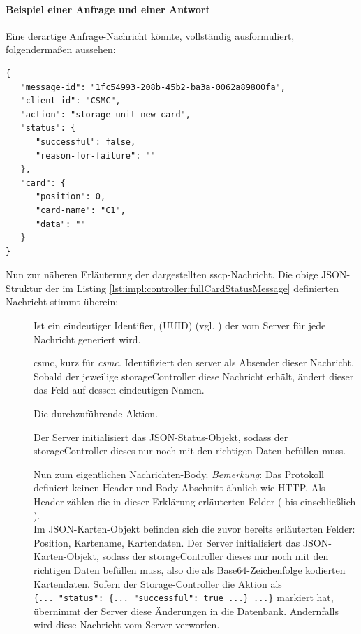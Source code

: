 \paragraph{Beispiel einer Anfrage und einer Antwort}
Eine derartige Anfrage-Nachricht könnte, vollständig ausformuliert, folgendermaßen aussehen:
\begin{lstlisting}[style=goMono,label={lst:impl:storagecontroller:jsonmessage},caption={\centering Anfrage: Ausformulierte JSON-Repräsentation eines Karten-Nachricht Objektes mit Header, Status und Card}]
{
   "message-id": "1fc54993-208b-45b2-ba3a-0062a89800fa",
   "client-id": "CSMC",   
   "action": "storage-unit-new-card",
   "status": {
      "successful": false,
      "reason-for-failure": ""
   },
   "card": {
      "position": 0,
      "card-name": "C1",
      "data": ""
   }
}
\end{lstlisting}
Nun zur näheren Erläuterung der dargestellten \acrshort{sscp}-Nachricht. Die obige JSON-Struktur der im Listing \ref{lst:impl:controller:fullCardStatusMessage} definierten Nachricht stimmt überein:
\begin{description}
\item[] Ist ein eindeutiger Identifier, (UUID) (vgl. \cite{wiki:uuid}) der vom Server für jede Nachricht generiert wird.
\item[] \acrshort{csmc}, kurz für \textit{\acrlong{csmc}}. Identifiziert den \gls{server} als Absender dieser Nachricht. Sobald der jeweilige \gls{storageController} diese Nachricht erhält, ändert dieser das Feld auf dessen eindeutigen Namen.
\item[] Die durchzuführende Aktion.
\item[] Der Server initialisiert das JSON-Status-Objekt, sodass der \gls{storageController} dieses nur noch mit den richtigen Daten befüllen muss.
\item[] Nun zum eigentlichen Nachrichten-Body. \textit{Bemerkung}: Das Protokoll definiert keinen Header und Body Abschnitt ähnlich wie HTTP. Als Header zählen die in dieser Erklärung erläuterten Felder ( bis einschließlich ).\\ Im JSON-Karten-Objekt befinden sich die zuvor bereits erläuterten Felder: Position, Kartename, Kartendaten. Der Server initialisiert das JSON-Karten-Objekt, sodass der \gls{storageController} dieses nur noch mit den richtigen Daten befüllen muss, also die als Base64-Zeichenfolge kodierten Kartendaten. Sofern der Storage-Controller die Aktion als\\ \verb|{... "status": {... "successful": true ...} ...}| markiert hat, übernimmt der Server diese Änderungen in die Datenbank. Andernfalls wird diese Nachricht vom Server verworfen.
\end{description}
